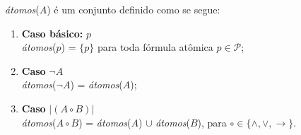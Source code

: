 \documentclass[12pt,a4paper,oneside]{article}
\begin{document}
\begin{enumerate}
	{\color{verde}
	
		{\it átomos}($A$) é um conjunto definido como se segue:
			\begin{enumerate}
				\item {\bf Caso básico:} $p$ \\{\it átomos}($p$) = $\{ p \}$ para toda fórmula atômica $p \in \mathcal{P}$;
				\item {\bf Caso} $\neg A$ \\{\it átomos}($\neg A$) = {\it átomos}($A$);
				\item {\bf Caso} $|(A \circ B)|$ \\{\it átomos}($A \circ B$) = {\it átomos}($A$) $\cup$ {\it átomos}($B$), para $\circ \in \{ \wedge, \vee, \rightarrow \}$.
			\end{enumerate}
	
	}
	
%	
		
%
%	
%	
	
\end{enumerate}
\end{document}
